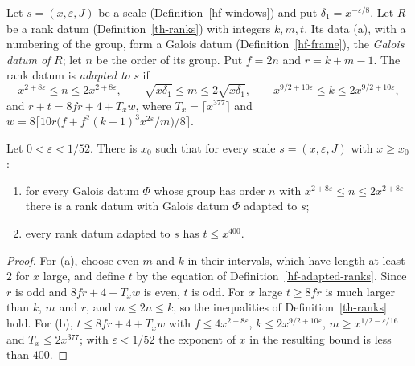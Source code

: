 \begin{definition}\label{hf-adapted-ranks}
Let $s=(x,\varepsilon,J)$ be a scale (Definition~\ref{hf-windows}) and put $\delta_1=x^{-\varepsilon/8}$.
Let $R$ be a rank datum (Definition~\ref{th-ranks}) with integers $k,m,t$. Its data (a), with a
numbering of the group, form a Galois datum (Definition~\ref{hf-frame}), the \emph{Galois datum of}
$R$; let $n$ be the order of its group.
Put $f=2n$ and $r=k+m-1$. The rank datum is \emph{adapted to} $s$ if
\[
 x^{2+8\varepsilon}\leq n\leq2x^{2+8\varepsilon},\qquad
 \sqrt{x\delta_1}\leq m\leq2\sqrt{x\delta_1},\qquad
 x^{9/2+10\varepsilon}\leq k\leq2x^{9/2+10\varepsilon},
\]
and $r+t=8fr+4+T_xw$, where $T_x=\lceil x^{377}\rceil$ and
$w=8\bigl\lceil10r\bigl(f+f^2(k-1)^3x^{2\varepsilon}/m\bigr)/8\bigr\rceil$.
\end{definition}

\begin{proposition}\label{hf-adapted-ranks-exist}
Let $0<\varepsilon<1/52$. There is $x_0$ such that for every scale $s=(x,\varepsilon,J)$ with
$x\geq x_0$:
\begin{enumerate}
\item for every Galois datum $\Phi$ whose group has order $n$ with $x^{2+8\varepsilon}\leq n\leq
  2x^{2+8\varepsilon}$ there is a rank datum with Galois datum $\Phi$ adapted to $s$;
\item every rank datum adapted to $s$ has $t\leq x^{400}$.
\end{enumerate}
\end{proposition}

\begin{proof}
For (a), choose even $m$ and $k$ in their intervals, which have length at least $2$ for $x$ large,
and define $t$ by the equation of Definition~\ref{hf-adapted-ranks}. Since $r$ is odd and $8fr+4+T_xw$
is even, $t$ is odd. For $x$ large $t\geq8fr$ is much larger than $k$, $m$ and $r$, and
$m\leq2n\leq k$, so the inequalities of Definition~\ref{th-ranks} hold. For (b),
$t\leq8fr+4+T_xw$ with $f\leq4x^{2+8\varepsilon}$, $k\leq2x^{9/2+10\varepsilon}$,
$m\geq x^{1/2-\varepsilon/16}$ and $T_x\leq2x^{377}$; with $\varepsilon<1/52$ the exponent of $x$ in
the resulting bound is less than $400$.
\end{proof}


